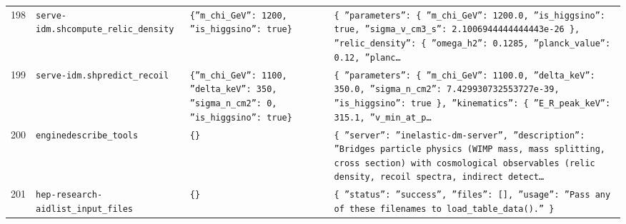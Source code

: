 \documentclass[11pt,a4paper]{article}
\begin{document}
\begin{longtable}{@{}p{}p{}p{}p{}@{}}
198 & \texttt{serve-idm.sh}\newline\texttt{compute\_\allowbreak{}relic\_\allowbreak{}density} & \texttt{\{''m\_\allowbreak{}chi\_\allowbreak{}GeV'':\allowbreak{} 1200,\allowbreak{} ''is\_\allowbreak{}higgsino'':\allowbreak{} true\}\allowbreak{}} & \texttt{\{   ''parameters'':\allowbreak{} \{     ''m\_\allowbreak{}chi\_\allowbreak{}GeV'':\allowbreak{} 1200.0,\allowbreak{}     ''is\_\allowbreak{}higgsino'':\allowbreak{} true,\allowbreak{}     ''sigma\_\allowbreak{}v\_\allowbreak{}cm3\_\allowbreak{}s'':\allowbreak{} 2.1006944444444443e-26   \}\allowbreak{},\allowbreak{}   ''relic\_\allowbreak{}density'':\allowbreak{} \{     ''omega\_\allowbreak{}h2'':\allowbreak{} 0.1285,\allowbreak{}     ''planck\_\allowbreak{}value'':\allowbreak{} 0.12,\allowbreak{}     ''planc\ldots{}\allowbreak{}} \\
199 & \texttt{serve-idm.sh}\newline\texttt{predict\_\allowbreak{}recoil} & \texttt{\{''m\_\allowbreak{}chi\_\allowbreak{}GeV'':\allowbreak{} 1100,\allowbreak{} ''delta\_\allowbreak{}keV'':\allowbreak{} 350,\allowbreak{} ''sigma\_\allowbreak{}n\_\allowbreak{}cm2'':\allowbreak{} 0,\allowbreak{} ''is\_\allowbreak{}higgsino'':\allowbreak{} true\}\allowbreak{}} & \texttt{\{   ''parameters'':\allowbreak{} \{     ''m\_\allowbreak{}chi\_\allowbreak{}GeV'':\allowbreak{} 1100.0,\allowbreak{}     ''delta\_\allowbreak{}keV'':\allowbreak{} 350.0,\allowbreak{}     ''sigma\_\allowbreak{}n\_\allowbreak{}cm2'':\allowbreak{} 7.429930732553727e-39,\allowbreak{}     ''is\_\allowbreak{}higgsino'':\allowbreak{} true   \}\allowbreak{},\allowbreak{}   ''kinematics'':\allowbreak{} \{     ''E\_\allowbreak{}R\_\allowbreak{}peak\_\allowbreak{}keV'':\allowbreak{} 315.1,\allowbreak{}     ''v\_\allowbreak{}min\_\allowbreak{}at\_\allowbreak{}p\ldots{}\allowbreak{}} \\
200 & \texttt{engine}\newline\texttt{describe\_\allowbreak{}tools} & \texttt{\{\}\allowbreak{}} & \texttt{\{   ''server'':\allowbreak{} ''inelastic-dm-server'',\allowbreak{}   ''description'':\allowbreak{} ''Bridges particle physics (WIMP mass,\allowbreak{} mass splitting,\allowbreak{} cross section)\allowbreak{} with cosmological observables (relic density,\allowbreak{} recoil spectra,\allowbreak{} indirect detect\ldots{}\allowbreak{}} \\
201 & \texttt{hep-research-aid}\newline\texttt{list\_\allowbreak{}input\_\allowbreak{}files} & \texttt{\{\}\allowbreak{}} & \texttt{\{   ''status'':\allowbreak{} ''success'',\allowbreak{}   ''files'':\allowbreak{} []\allowbreak{},\allowbreak{}   ''usage'':\allowbreak{} ''Pass any of these filenames to load\_\allowbreak{}table\_\allowbreak{}data()\allowbreak{}.'' \}\allowbreak{}} \\

\end{longtable}
\end{document}
